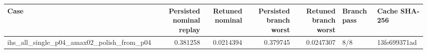 \begin{tabular}{lrrrrll}
\toprule
Case & Persisted nominal replay & Retuned nominal & Persisted branch worst & Retuned branch worst & Branch pass & Cache SHA-256 \\
\midrule
ihs\_all\_single\_p04\_amax02\_polish\_from\_p04 & 0.381258 & 0.0214394 & 0.379745 & 0.0247307 & 8/8 & 13fe699371ad \\
\bottomrule
\end{tabular}
